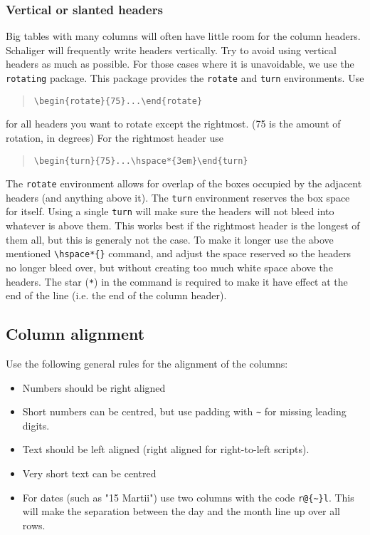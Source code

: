 \documentclass{report}
\begin{document}
\subsubsection{Vertical or slanted headers}
Big tables with many columns will often have little room for the column headers.
Schaliger will frequently write headers vertically.
Try to avoid using vertical headers as much as possible.
For those cases where it is unavoidable, we use the \verb+rotating+ package.
This package provides the \verb+rotate+ and \verb+turn+ environments.
Use 
\begin{quote}
\verb+\begin{rotate}{75}...\end{rotate}+
\end{quote}
for all headers you want to rotate except the rightmost.
(75 is the amount of rotation, in degrees) 
For the rightmost header use
\begin{quote}
\verb+\begin{turn}{75}...\hspace*{3em}\end{turn}+
\end{quote}


The \verb+rotate+ environment allows for overlap of the boxes occupied by
the adjacent headers (and anything above it).
The \verb+turn+ environment reserves the box space for itself.
Using a single \verb+turn+ will make sure the headers will not bleed into
whatever is above them.
This works best if the rightmost header is the longest of them all, but this
is generaly not the case. To make it longer use the above mentioned
\verb+\hspace*{}+ command, and adjust the space reserved so the headers no longer
bleed over, but without creating too much white space above the headers.
The star (\verb+*+) in the command is required to make it have effect at
the end of the line (i.e. the end of the column header).

\subsection{Column alignment}
Use the following general rules for the alignment of the columns:
\begin{itemize}
\item Numbers should be right aligned
\item Short numbers can be centred, but use padding with \verb+~+ for missing
leading digits.
\item Text should be left aligned (right aligned for right-to-left scripts).
\item Very short text can be centred
\item For dates (such as "15 Martii") use two columns with the code
\verb+r@{~}l+.
This will make the separation between the day and the month line up
over all rows.
\end{itemize}
\end{document}
